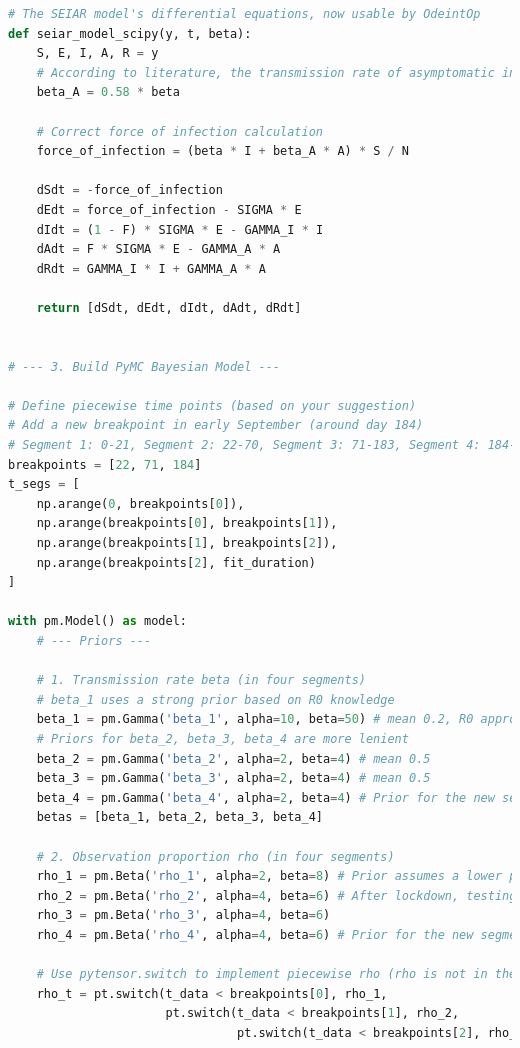 \documentclass[12pt, a4paper]{article}
\begin{document}
\begin{lstlisting}[language=Python, caption=Python script for constructing and sampling the Bayesian SEIAR model using PyMC.]
# The SEIAR model's differential equations, now usable by OdeintOp
def seiar_model_scipy(y, t, beta):
    S, E, I, A, R = y
    # According to literature, the transmission rate of asymptomatic individuals is 0.58 times that of symptomatic ones
    beta_A = 0.58 * beta
    
    # Correct force of infection calculation
    force_of_infection = (beta * I + beta_A * A) * S / N
    
    dSdt = -force_of_infection
    dEdt = force_of_infection - SIGMA * E
    dIdt = (1 - F) * SIGMA * E - GAMMA_I * I
    dAdt = F * SIGMA * E - GAMMA_A * A
    dRdt = GAMMA_I * I + GAMMA_A * A
    
    return [dSdt, dEdt, dIdt, dAdt, dRdt]


# --- 3. Build PyMC Bayesian Model ---

# Define piecewise time points (based on your suggestion)
# Add a new breakpoint in early September (around day 184)
# Segment 1: 0-21, Segment 2: 22-70, Segment 3: 71-183, Segment 4: 184-269
breakpoints = [22, 71, 184]
t_segs = [
    np.arange(0, breakpoints[0]),
    np.arange(breakpoints[0], breakpoints[1]),
    np.arange(breakpoints[1], breakpoints[2]),
    np.arange(breakpoints[2], fit_duration)
]

with pm.Model() as model:
    # --- Priors ---
    
    # 1. Transmission rate beta (in four segments)
    # beta_1 uses a strong prior based on R0 knowledge
    beta_1 = pm.Gamma('beta_1', alpha=10, beta=50) # mean 0.2, R0 approx 3.5, strong constraint
    # Priors for beta_2, beta_3, beta_4 are more lenient
    beta_2 = pm.Gamma('beta_2', alpha=2, beta=4) # mean 0.5
    beta_3 = pm.Gamma('beta_3', alpha=2, beta=4) # mean 0.5
    beta_4 = pm.Gamma('beta_4', alpha=2, beta=4) # Prior for the new segment
    betas = [beta_1, beta_2, beta_3, beta_4]
    
    # 2. Observation proportion rho (in four segments)
    rho_1 = pm.Beta('rho_1', alpha=2, beta=8) # Prior assumes a lower proportion
    rho_2 = pm.Beta('rho_2', alpha=4, beta=6) # After lockdown, testing capacity increased, so proportion might be slightly higher
    rho_3 = pm.Beta('rho_3', alpha=4, beta=6)
    rho_4 = pm.Beta('rho_4', alpha=4, beta=6) # Prior for the new segment
    
    # Use pytensor.switch to implement piecewise rho (rho is not in the ODE itself, but used during observation)
    rho_t = pt.switch(t_data < breakpoints[0], rho_1,
                      pt.switch(t_data < breakpoints[1], rho_2,
                                pt.switch(t_data < breakpoints[2], rho_3, rho_4)))
                      

\end{lstlisting}
\end{document}

